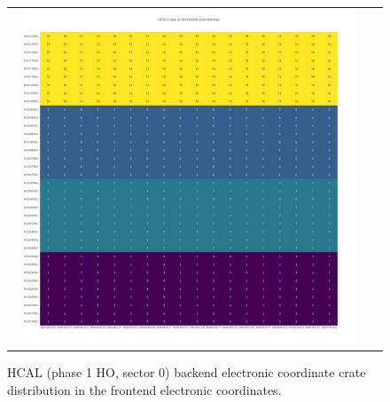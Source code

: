 \begin{figure}[htb]
 \begin{center}
  \begin{tabular}{cc}
   \includegraphics[angle=0,width=0.95\textwidth]{figures/appendix/HO0_Crate_in_FrontEnd.png}
  \end{tabular}
  \caption{HCAL (phase 1 HO, sector 0) backend electronic coordinate crate distribution in the frontend electronic coordinates.}
  \label{fig:lmapHO0CrateFEC}
 \end{center}
\end{figure}
\clearpage

